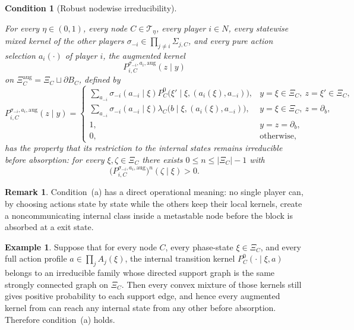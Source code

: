 \documentclass[12pt]{article}
\newtheorem{condition}[theorem]{Condition}
\theoremstyle{definition}
\newtheorem{remark}[theorem]{Remark}
\newtheorem{example}[theorem]{Example}
\newcommand{\1}{\mathbf{1}}
\newcommand{\cT}{\mathcal{T}}
\begin{document}
\begin{condition}[Robust nodewise irreducibility]
\label{cond:a}

For every $\eta\in(0,1)$, every node $C\in\cT_\eta$, every player $i\in N$, every
statewise mixed kernel of the other players
$\sigma_{-i}\in\prod_{j\ne i}\Sigma_{j,C}$, and every pure action selection
$a_i(\cdot)$ of player $i$, the augmented kernel
\[
P_{i,C}^{\sigma_{-i},a_i,\mathrm{aug}}(z\mid y)
\]
on $\Xi_C^{\mathrm{aug}}=\Xi_C\sqcup\partial B_C$, defined by
\[
P_{i,C}^{\sigma_{-i},a_i,\mathrm{aug}}(z\mid y)
=
\begin{cases}
\displaystyle
\sum_{a_{-i}}\sigma_{-i}(a_{-i}\mid\xi)
P_C^0\bigl(\xi'\mid\xi,(a_i(\xi),a_{-i})\bigr),
& y=\xi\in\Xi_C,\ z=\xi'\in\Xi_C,\\[0.7em]
\displaystyle
\sum_{a_{-i}}\sigma_{-i}(a_{-i}\mid\xi)
\lambda_C\bigl(b\mid\xi,(a_i(\xi),a_{-i})\bigr),
& y=\xi\in\Xi_C,\ z=\partial_b,\\[0.7em]
1, & y=z=\partial_b,\\
0, & \text{otherwise,}
\end{cases}
\]
has the property that its restriction to the internal states remains irreducible
before absorption: for every $\xi,\zeta\in\Xi_C$ there exists
$0\le n\le |\Xi_C|-1$ with
\[
\bigl(P_{i,C}^{\sigma_{-i},a_i,\mathrm{aug}}\bigr)^n(\zeta\mid\xi)>0.
\]
\end{condition}

\begin{remark}
Condition~\textnormal{(a)} has a direct operational meaning: no single player can,
by choosing actions state by state while the others keep their local kernels,
create a noncommunicating internal class inside a metastable node before the block
is absorbed at a exit state.
\end{remark}

\begin{example}
\label{ex:cond-a-trivial}
Suppose that for every node $C$, every phase-state $\xi\in\Xi_C$, and every full
action profile $a\in\prod_j A_j(\xi)$, the internal transition kernel
$P_C^0(\cdot\mid\xi,a)$ belongs to an irreducible family whose directed support
graph is the same strongly connected graph on $\Xi_C$. Then every convex mixture
of those kernels still gives positive probability to each support edge, and hence
every augmented kernel from  can reach any internal state from any
other before absorption. Therefore condition~\textnormal{(a)} holds.
\end{example}
\end{document}
